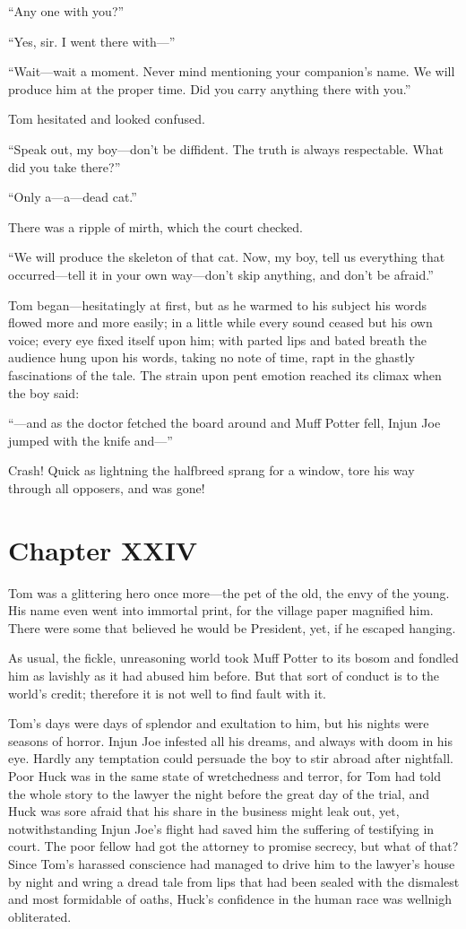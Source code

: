 \documentclass{book}
\begin{document}
“Any one with you?”

“Yes, sir. I went there with—”

“Wait—wait a moment. Never mind mentioning your companion’s name. We will produce him at the proper time. Did you carry anything there with you.”

Tom hesitated and looked confused.

“Speak out, my boy—don’t be diffident. The truth is always respectable. What did you take there?”

“Only a—a—dead cat.”

There was a ripple of mirth, which the court checked.

“We will produce the skeleton of that cat. Now, my boy, tell us everything that occurred—tell it in your own way—don’t skip anything, and don’t be afraid.”

Tom began—hesitatingly at first, but as he warmed to his subject his words flowed more and more easily; in a little while every sound ceased but his own voice; every eye fixed itself upon him; with parted lips and bated breath the audience hung upon his words, taking no note of time, rapt in the ghastly fascinations of the tale. The strain upon pent emotion reached its climax when the boy said:

“—and as the doctor fetched the board around and Muff Potter fell, Injun Joe jumped with the knife and—”

Crash! Quick as lightning the halfbreed sprang for a window, tore his way through all opposers, and was gone!

\chapter*{Chapter XXIV}

Tom was a glittering hero once more—the pet of the old, the envy of the young. His name even went into immortal print, for the village paper magnified him. There were some that believed he would be President, yet, if he escaped hanging.

As usual, the fickle, unreasoning world took Muff Potter to its bosom and fondled him as lavishly as it had abused him before. But that sort of conduct is to the world’s credit; therefore it is not well to find fault with it.

Tom’s days were days of splendor and exultation to him, but his nights were seasons of horror. Injun Joe infested all his dreams, and always with doom in his eye. Hardly any temptation could persuade the boy to stir abroad after nightfall. Poor Huck was in the same state of wretchedness and terror, for Tom had told the whole story to the lawyer the night before the great day of the trial, and Huck was sore afraid that his share in the business might leak out, yet, notwithstanding Injun Joe’s flight had saved him the suffering of testifying in court. The poor fellow had got the attorney to promise secrecy, but what of that? Since Tom’s harassed conscience had managed to drive him to the lawyer’s house by night and wring a dread tale from lips that had been sealed with the dismalest and most formidable of oaths, Huck’s confidence in the human race was wellnigh obliterated.
\end{document}
